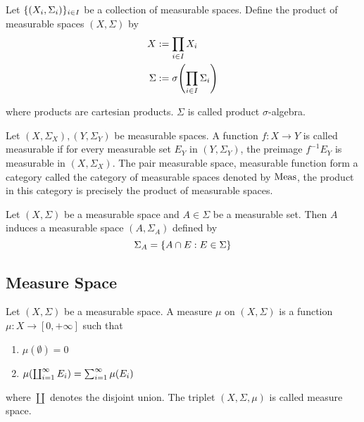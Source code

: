 \documentclass{report}
\begin{document}
\begin{definition}
    Let $\{(X_i, \Sigma_i)\}_{i \in I}$ be a collection of measurable spaces. Define the product of measurable spaces $(X, \Sigma)$ by
    \begin{align*}
        X       &:= \prod_{i \in I} X_i \\
        \Sigma  &:= \sigma \tuple*{\prod_{i \in I} \Sigma_i}
    \end{align*}
    
    where products are cartesian products. $\Sigma$ is called product $\sigma$-algebra.
\end{definition}

\begin{definition}
    Let $(X, \Sigma_X), (Y, \Sigma_Y)$ be measurable spaces. A function $f: X \to Y$ is called measurable if for every measurable set $E_Y$ in $(Y, \Sigma_Y)$, the preimage $f^{-1} E_Y$ is measurable in $(X, \Sigma_X)$. The pair measurable space, measurable function form a category called the category of measurable spaces denoted by $\operatorname{Meas}$, the product in this category is precisely the product of measurable spaces.
\end{definition}

\begin{definition}[subspace]
    Let $(X, \Sigma)$ be a measurable space and $A \in \Sigma$ be a measurable set. Then $A$ induces a measurable space $(A, \Sigma_A)$ defined by
    $$
        \Sigma_A = \{A \cap E: E \in \Sigma\}
    $$
\end{definition}

\subsection{Measure Space}

\begin{definition}
    Let $(X, \Sigma)$ be a measurable space. A measure $\mu$ on $(X, \Sigma)$ is a function $\mu: X \to [0, +\infty]$ such that
    \begin{enumerate}
        \item $\mu(\emptyset) = 0$
        \item $\mu\tuple*{\coprod_{i=1}^\infty E_i} = \sum_{i=1}^\infty \mu(E_i)$
    \end{enumerate}
    where $\coprod$ denotes the disjoint union. The triplet $(X, \Sigma, \mu)$ is called measure space.
\end{definition}
\end{document}
